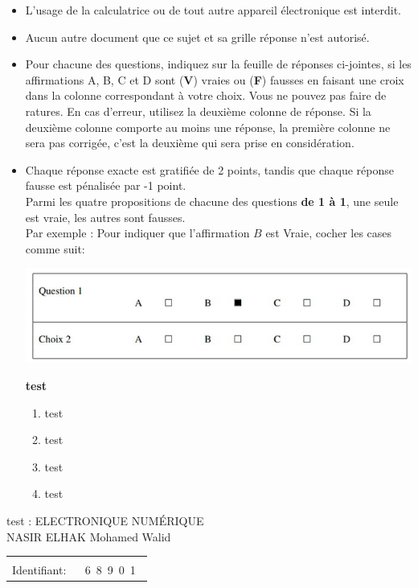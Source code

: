\documentclass{book}%
\begin{document}
\begin{itemize}%
\item%
L'usage de la calculatrice ou de tout autre appareil électronique est interdit.%
\item%
Aucun autre document que ce sujet et sa grille réponse n'est autorisé.%
\item%
Pour chacune des questions, indiquez sur la feuille de réponses ci-jointes, si les affirmations A, B, C et D sont (\textbf{V}) vraies ou (\textbf{F}) fausses en faisant une croix dans la colonne correspondant à votre choix. Vous ne pouvez pas faire de ratures. En cas d'erreur, utilisez la deuxième colonne de réponse. Si la deuxième colonne comporte au moins une réponse, la première colonne ne sera pas corrigée, c'est la deuxième qui sera prise en considération.%
\item%
Chaque réponse exacte est gratifiée de 2 points, tandis que chaque réponse fausse est pénalisée par -1 point. \\ 	Parmi les quatre propositions de chacune des questions \textbf{de 1 à 1}, une seule est vraie, les autres sont fausses. \\ 	Par exemple : Pour indiquer que l'affirmation $B$ est Vraie, cocher les cases comme suit:  \\ \begin{center}	\includegraphics[scale=0.8]{reponses.png} \end{center}%
\thispagestyle{empty}%
\begin{exercise}%
\textbf{test }%
\begin{enumerate}[label=\textbf{\Alph*. }]%
\item%
test%
\item%
test%
\item%
test%
\item%
test%
\end{enumerate}%
\end{exercise}%
\end{itemize}%
\newpage%
\thispagestyle{empty}%
test : ELECTRONIQUE NUMÉRIQUE $\qquad \qquad \qquad \qquad \qquad \qquad \qquad \qquad$ NASIR ELHAK Mohamed Walid%
\begin{flushright}%
\begin{tabular}{|l|}%
\hline%
 \\%
\thispagestyle{empty}%
Identifiant: $\quad$ {\Large 6~8~9~0~1~}%
 \\%
\hline%
\end{tabular}%
\end{flushright}%
\end{document}
